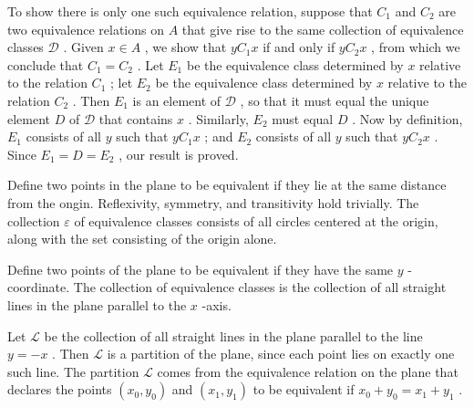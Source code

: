 To show there is only one such equivalence relation, suppose that \({C}_{1}\) and \({C}_{2}\) are two equivalence relations on \(A\) that give rise to the same collection of equivalence classes \(\mathcal{D}\) . Given \(x \in  A\) , we show that \(y{C}_{1}x\) if and only if \(y{C}_{2}x\) , from which we conclude that \({C}_{1} = {C}_{2}\) . Let \({E}_{1}\) be the equivalence class determined by \(x\) relative to the relation \({C}_{1}\) ; let \({E}_{2}\) be the equivalence class determined by \(x\) relative to the relation \({C}_{2}\) . Then \({E}_{1}\) is an element of \(\mathcal{D}\) , so that it must equal the unique element \(D\) of \(\mathcal{D}\) that contains \(x\) . Similarly, \({E}_{2}\) must equal \(D\) . Now by definition, \({E}_{1}\) consists of all \(y\) such that \(y{C}_{1}x\) ; and \({E}_{2}\) consists of all \(y\) such that \(y{C}_{2}x\) . Since \({E}_{1} = D = {E}_{2}\) , our result is proved.

\begin{centeredblock}
\begin{example} Define two points in the plane to be equivalent if they lie at the same distance from the ongin. Reflexivity, symmetry, and transitivity hold trivially. The collection \(\varepsilon\) of equivalence classes consists of all circles centered at the origin, along with the set consisting of the origin alone.
\end{example}
\end{centeredblock}

\begin{centeredblock}
\begin{example} Define two points of the plane to be equivalent if they have the same \(y\) -coordinate. The collection of equivalence classes is the collection of all straight lines in the plane parallel to the \(x\) -axis.
\end{example}
\end{centeredblock}

\begin{centeredblock}
\begin{example} Let \(\mathcal{L}\) be the collection of all straight lines in the plane parallel to the line \(y =  - x\) . Then \(\mathcal{L}\) is a partition of the plane, since each point lies on exactly one such line. The partition \(\mathcal{L}\) comes from the equivalence relation on the plane that declares the points \(\left( {{x}_{0},{y}_{0}}\right)\) and \(\left( {{x}_{1},{y}_{1}}\right)\) to be equivalent if \({x}_{0} + {y}_{0} = {x}_{1} + {y}_{1}\) .
\end{example}
\end{centeredblock}

